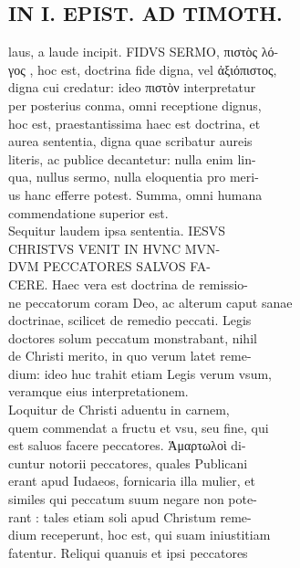 \documentclass{article}
\begin{document}
\begin{pages}
\section*{IN I. EPIST. AD TIMOTH. \\
                }
laus, a laude incipit. FIDVS SERMO, πιστὸς λό- \\
                γος , hoc est, doctrina fide digna, vel ἀξιόπιστος, \\
                digna cui credatur: ideo πιστὸν interpretatur \\
                per posterius conma, omni receptione dignus, \\
                hoc est, praestantissima haec est doctrina, et \\
                aurea sententia, digna quae scribatur aureis \\
                literis, ac publice decantetur: nulla enim lin- \\
                qua, nullus sermo, nulla eloquentia pro meri- \\
                us hanc efferre potest. Summa, omni humana \\
                commendatione superior est. \\
                Sequitur laudem ipsa sententia. IESVS \\
                CHRISTVS VENIT IN HVNC MVN- \\
                DVM PECCATORES SALVOS FA- \\
                CERE. Haec vera est doctrina de remissio- \\
                ne peccatorum coram Deo, ac alterum caput sanae \\
                doctrinae, scilicet de remedio peccati. Legis \\
                doctores solum peccatum monstrabant, nihil \\
                de Christi merito, in quo verum latet reme- \\
                dium: ideo huc trahit etiam Legis verum vsum, \\
                veramque eius interpretationem. \\
                Loquitur de Christi aduentu in carnem, \\
                quem commendat a fructu et vsu, seu fine, qui \\
                est saluos facere peccatores. Ἁμαρτωλοὶ di- \\
                cuntur notorii peccatores, quales Publicani \\
                erant apud Iudaeos, fornicaria illa mulier, et \\
                similes qui peccatum suum negare non pote- \\
                rant : tales etiam soli apud Christum reme- \\
                dium receperunt, hoc est, qui suam iniustitiam \\
                fatentur. Reliqui quanuis et ipsi peccatores \\
                

\end{pages}
\end{document}
